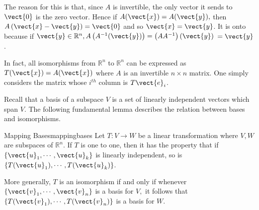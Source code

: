 \begin{solution}
The reason for this is that, since $A$ is invertible, the only vector it
sends to $\vect{0}$ is the zero vector. Hence if $A(\vect{x})=A(\vect{y}),$ then $A\left( \vect{x}-\vect{y}\right) =\vect{0}$ and so $\vect{x}=\vect{y}$. It is onto
because if $\vect{y}\in \mathbb{R}^{n},A\left( A^{-1} (\vect{y})\right) =\left(
AA^{-1}\right) (\vect{y})$ $=\vect{y}$. 
\end{solution}

In fact, all isomorphisms from $\mathbb{R}^{n}$ to $\mathbb{R}^{n}$ can be expressed as $T(\vect{x}) = A(\vect{x})$ where $A$ is an invertible $n \times n$ matrix. One
simply considers the matrix whose $i^{th}$ column is $T\vect{e}_{i}$.

Recall that a basis of a subspace $V$ is a set of linearly independent vectors which span $V$. The following fundamental lemma describes the relation between bases and
isomorphisms.

\begin{lemma}{Mapping Bases}{mappingbases}
Let $T:V\rightarrow W$ be a linear transformation where $V,W$ are
subspaces of $\mathbb{R}^n$. If $T$ is one to one, then it has the property that if $\left\{ \vect{u}_{1},\cdots ,\vect{u}_{k}\right\} $ is linearly independent, so is $\left\{ T(\vect{u}_{1}),\cdots ,T(\vect{u}_{k})\right\} $.

More generally, $T$ is an isomorphism if and only if whenever $\left\{ 
\vect{v}_{1},\cdots ,\vect{v}_{n}\right\} $ is a basis for $V,$ it follows that $\left\{ T
(\vect{v}_{1}),\cdots ,T(\vect{v}_{n})\right\} $ is a basis for $W$. 
\end{lemma}

